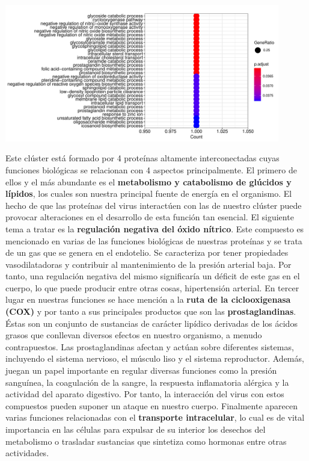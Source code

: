 \begin{center}
\includegraphics[width=120mm,scale=1]{report/figures/enrichGO_dotplot-BP-84.pdf}
\end{center}

Este clúster está formado por 4 proteínas altamente interconectadas cuyas funciones biológicas se relacionan con 4 aspectos principalmente. El primero de ellos y el más abundante es el \textbf{metabolismo y catabolismo de glúcidos y lípidos}, los cuales son nuestra principal fuente de energía en el organismo. El hecho de que las proteínas del virus interactúen con las de nuestro clúster puede provocar alteraciones en el desarrollo de esta función tan esencial. El siguiente tema a tratar es la \textbf{regulación negativa del óxido nítrico}. Este compuesto es mencionado en varias de las funciones biológicas de nuestras proteínas y se trata de un gas que se genera en el endotelio. Se caracteriza por tener propiedades vasodilatadoras y contribuir al mantenimiento de la presión arterial baja. Por tanto, una regulación negativa del mismo significaría un déficit de este gas en el cuerpo, lo que puede producir entre otras cosas, hipertensión arterial. En tercer lugar en nuestras funciones se hace mención a la \textbf{ruta de la ciclooxigenasa (COX)} y por tanto a sus principales productos que son las \textbf{prostaglandinas}. Éstas son un conjunto de sustancias de carácter lipídico derivadas de los ácidos grasos que conllevan diversos efectos en nuestro organismo, a menudo contrapuestos. Las prostaglandinas afectan y actúan sobre diferentes sistemas, incluyendo el sistema nervioso, el músculo liso y el sistema reproductor. Además, juegan un papel importante en regular diversas funciones como la presión sanguínea, la coagulación de la sangre, la respuesta inflamatoria alérgica y la actividad del aparato digestivo. Por tanto, la interacción del virus con estos compuestos pueden suponer un ataque en nuestro cuerpo. Finalmente aparecen varias funciones relacionadas con el \textbf{transporte intracelular}, lo cual es de vital importancia en las células para expulsar de su interior los desechos del metabolismo o trasladar sustancias que sintetiza como hormonas entre otras actividades.

